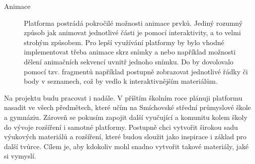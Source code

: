 \begin{description}
  \item[Animace] Platforma postrádá pokročilé možnosti animace prvků.
  Jediný rozumný způsob jak animovat jednotlivé části je pomocí interaktivity, a to velmi strohým způsobem.
  Pro lepší využívání platformy by bylo vhodné implementovat třeba animace skrz snímky a nebo například možnosti dělení animačních sekvencí uvnitř jednoho snímku.
  Do by dovolovalo pomocí tzv. fragmentů například postupně zobrazovat jednotlivé řádky či body v seznamech, což by vedlo k interaktivnějším materiálům.
\end{description}

Na projektu budu pracovat i nadále. 
V příštím školním roce plánuji platformu nasadit ve všech předmětech, které učím na Smíchovské střední průmyslové škole a gymnáziu.
Zároveň se pokusím zapojit další vyučující a komunitu kolem školy do vývoje rozšíření i samotné platformy.
Postupně chci vytvořit širokou sadu výukových materiálů a rozšíření, které budou sloužit jako inspirace i základ pro další tvůrce. 
Cílem je, aby kdokoliv mohl snadno vytvořit takové materiály, jaké si vymyslí.








